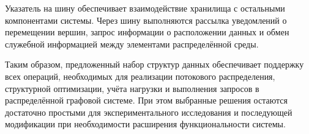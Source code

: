 Указатель на шину обеспечивает взаимодействие хранилища с остальными компонентами системы. Через шину выполняются рассылка уведомлений о перемещении вершин, запрос информации о расположении данных и обмен служебной информацией между элементами распределённой среды.

Таким образом, предложенный набор структур данных обеспечивает поддержку всех операций, необходимых для реализации потокового распределения, структурной оптимизации, учёта нагрузки и выполнения запросов в распределённой графовой системе. При этом выбранные решения остаются достаточно простыми для экспериментального исследования и последующей модификации при необходимости расширения функциональности системы.